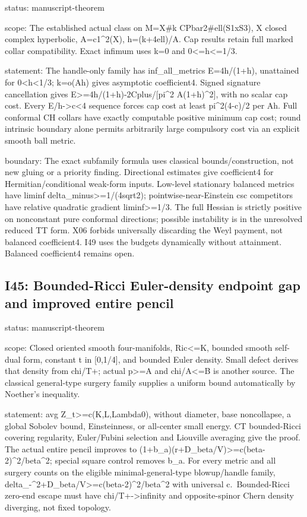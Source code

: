 \documentclass[
  10pt,
]{article}
\begin{document}
status: manuscript-theorem

scope: The established actual class on M=X\#k CPbar2\#ell(S1xS3), X
closed complex hyperbolic, A=c1\^{}2(X), h=(k+4ell)/A. Cap results
retain full marked collar compatibility. Exact infimum uses k=0 and
0\textless=h\textless=1/3.

statement: The handle-only family has inf\_all\_metrics E=4h/(1+h),
unattained for 0\textless h\textless1/3; k=o(Ah) gives asymptotic
coefficient4. Signed signature cancellation gives
E\textgreater=4h/(1+h)-2Cplus/{[}pi\^{}2 A(1+h)\^{}2{]}, with no scalar
cap cost. Every E/h-\textgreater c\textless4 sequence forces cap cost at
least pi\^{}2(4-c)/2 per Ah. Full conformal CH collars have exactly
computable positive minimum cap cost; round intrinsic boundary alone
permits arbitrarily large compulsory cost via an explicit smooth ball
metric.

boundary: The exact subfamily formula uses classical
bounds/construction, not new gluing or a priority finding. Directional
estimates give coefficient4 for Hermitian/conditional weak-form inputs.
Low-level stationary balanced metrics have liminf
delta\_minus\textgreater=1/(4sqrt2); pointwise-near-Einstein csc
competitors have relative quadratic gradient liminf\textgreater=1/3. The
full Hessian is strictly positive on nonconstant pure conformal
directions; possible instability is in the unresolved reduced TT form.
X06 forbids universally discarding the Weyl payment, not balanced
coefficient4. I49 uses the budgets dynamically without attainment.
Balanced coefficient4 remains open.

\hypertarget{i45-bounded-ricci-euler-density-endpoint-gap-and-improved-entire-pencil}{%
\subsection{I45: Bounded-Ricci Euler-density endpoint gap and improved
entire
pencil}\label{i45-bounded-ricci-euler-density-endpoint-gap-and-improved-entire-pencil}}

status: manuscript-theorem

scope: Closed oriented smooth four-manifolds,
\textbar Ric\textbar\textless=K, bounded smooth self-dual form, constant
t in {[}0,1/4{]}, and bounded Euler density. Small defect derives that
density from chi/T+; actual p\textgreater=A and chi/A\textless=B is
another source. The classical general-type surgery family supplies a
uniform bound automatically by Noether's inequality.

statement: avg Z\_t\textgreater=c(K,L,Lambda0), without diameter, base
noncollapse, a global Sobolev bound, Einsteinness, or all-center small
energy. CT bounded-Ricci covering regularity, Euler/Fubini selection and
Liouville averaging give the proof. The actual entire pencil improves to
(1+b\_a)(r+D\_beta/V)\textgreater=c(beta-2)\^{}2/beta\^{}2; special
square control removes b\_a. For every metric and all surgery counts on
the eligible minimal-general-type blowup/handle family,
delta\_-\^{}2+D\_beta/V\textgreater=c(beta-2)\^{}2/beta\^{}2 with
universal c.~Bounded-Ricci zero-end escape must have
chi/T+-\textgreater infinity and opposite-spinor Chern density
diverging, not fixed topology.
\end{document}
